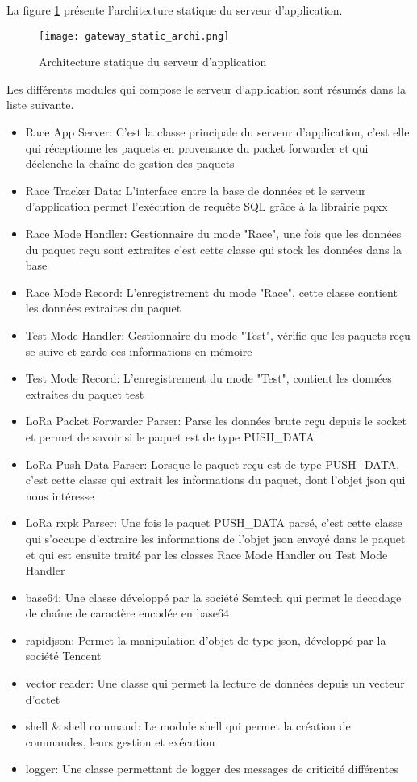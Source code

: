 La figure \ref{fig:gateway_static_archi} présente l'architecture statique du serveur d'application.

\begin{figure}[htb]
\centering 
\texttt{[image: gateway\_static\_archi.png]} 
\caption{Architecture statique du serveur d'application}
\label{fig:gateway_static_archi}
\end{figure}

Les différents modules qui compose le serveur d'application sont résumés dans la liste suivante.

\begin{itemize}
\item Race App Server: C'est la classe principale du serveur d'application, c'est elle qui réceptionne les paquets en provenance du packet forwarder et qui déclenche la chaîne de gestion des paquets
\item Race Tracker Data: L'interface entre la base de données et le serveur d'application permet l'exécution de requête SQL grâce à la librairie pqxx
\item Race Mode Handler: Gestionnaire du mode "Race", une fois que les données du paquet reçu sont extraites c'est cette classe qui stock les données dans la base
\item Race Mode Record: L'enregistrement du mode "Race", cette classe contient les données extraites du paquet
\item Test Mode Handler: Gestionnaire du mode "Test", vérifie que les paquets reçu se suive et garde ces informations en mémoire
\item Test Mode Record: L'enregistrement du mode "Test", contient les données extraites du paquet test
\item LoRa Packet Forwarder Parser: Parse les données brute reçu depuis le socket et permet de savoir si le paquet est de type PUSH\_DATA
\item LoRa Push Data Parser: Lorsque le paquet reçu est de type PUSH\_DATA, c'est cette classe qui extrait les informations du paquet, dont l'objet json qui nous intéresse
\item LoRa rxpk Parser: Une fois le paquet PUSH\_DATA parsé, c'est cette classe qui s'occupe d'extraire les informations de l'objet json envoyé dans le paquet et qui est ensuite traité par les classes Race Mode Handler ou Test Mode Handler
\item base64: Une classe développé par la société Semtech qui permet le decodage de chaîne de caractère encodée en base64
\item rapidjson: Permet la manipulation d'objet de type json, développé par la société Tencent
\item vector reader: Une classe qui permet la lecture de données depuis un vecteur d'octet
\item shell \& shell command: Le module shell qui permet la création de commandes, leurs gestion et exécution
\item logger: Une classe permettant de logger des messages de criticité différentes
\end{itemize}


